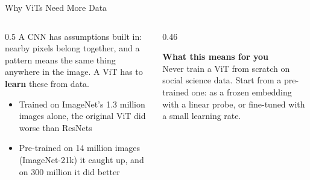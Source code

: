 \begin{frame}{Why ViTs Need More Data}
\begin{columns}[T]
\begin{column}{0.5\textwidth}
A CNN has assumptions built in: nearby pixels belong together, and a pattern means the same thing
anywhere in the image. A ViT has to \textbf{learn} these from data.

\vspace{0.2cm}
\begin{itemize}
\item Trained on ImageNet's 1.3 million images alone, the original ViT did worse than ResNets
\item Pre-trained on 14 million images (ImageNet-21k) it caught up, and on 300 million it did better
\end{itemize}
\end{column}
\begin{column}{0.46\textwidth}
\begin{graybox}
\textbf{What this means for you}\\
Never train a ViT from scratch on social science data. Start from a pre-trained one: as a frozen
embedding with a linear probe, or fine-tuned with a small learning rate.
\end{graybox}
\end{column}
\end{columns}
\end{frame}

